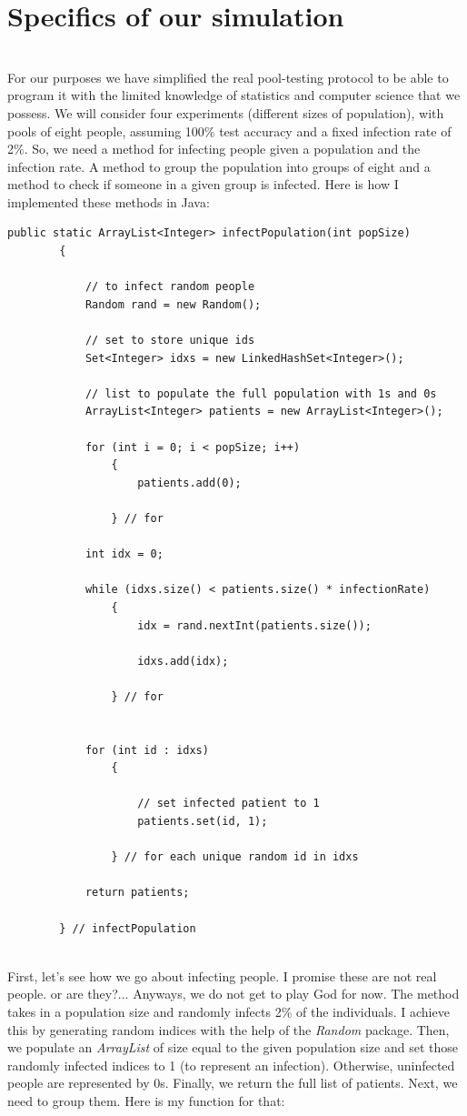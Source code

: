 \documentclass[letterpaper, 10pt]{article}
\begin{document}
\section{Specifics of our simulation}
\\
For our purposes we have simplified the real pool-testing protocol to be able to program it with the limited knowledge of statistics and computer science that we possess. We will consider four experiments (different sizes of population), with pools of eight people, assuming 100\% test accuracy and a fixed infection rate of 2\%. So, we need a method for infecting people given a population and the infection rate. A method to group the population into groups of eight and a method to check if someone in a given group is infected. Here is how I implemented these methods in Java:
\begin{lstlisting}
public static ArrayList<Integer> infectPopulation(int popSize)
		{
			
			// to infect random people
			Random rand = new Random();
			
			// set to store unique ids
			Set<Integer> idxs = new LinkedHashSet<Integer>();
			
			// list to populate the full population with 1s and 0s
	        ArrayList<Integer> patients = new ArrayList<Integer>();
	        
	        for (int i = 0; i < popSize; i++)
				{
		        	patients.add(0);
				    
				} // for
	        
	        int idx = 0;
			
			while (idxs.size() < patients.size() * infectionRate)
				{
				    idx = rand.nextInt(patients.size());
				    
				    idxs.add(idx);
				    
				} // for

			
			for (int id : idxs)
				{
				    
				    // set infected patient to 1
				    patients.set(id, 1);
					
				} // for each unique random id in idxs
			
	        return patients;
	        
	    } // infectPopulation
\end{lstlisting}
\\
First, let's see how we go about infecting people. I promise these are not real people. or are they?... Anyways, we do not get to play God for now. The method takes in a population size and randomly infects 2\% of the individuals. I achieve this by generating random indices with the help of the \textit{Random} package. Then, we populate an \textit{ArrayList} of size equal to the given population size and set those randomly infected indices to 1 (to represent an infection). Otherwise, uninfected people are represented by 0s. Finally, we return the full list of patients. Next, we need to group them. Here is my function for that:
\end{document}
